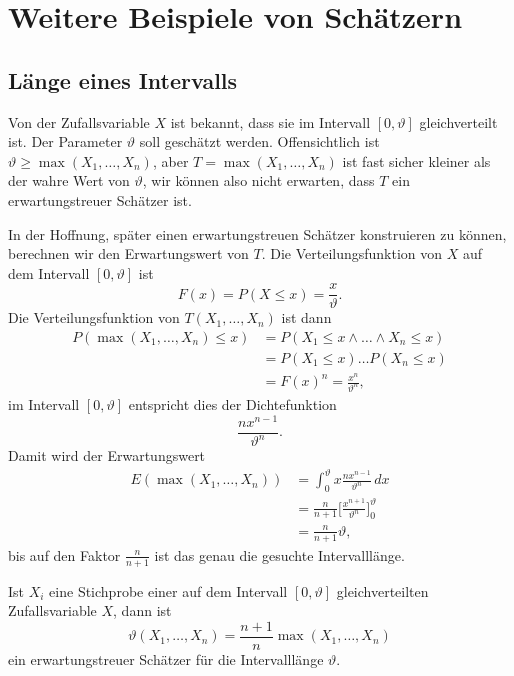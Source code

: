 \section{Weitere Beispiele von Schätzern} \label{section-weitere-beispiele-von-schaetzern}
\subsection{Länge eines Intervalls}
Von der Zufallsvariable $X$ ist bekannt, dass sie im Intervall $[0,\vartheta]$
gleichverteilt ist.
Der Parameter $\vartheta$ soll geschätzt werden.
Offensichtlich ist $\vartheta \ge \max(X_1,\dots,X_n)$,
aber $T=\max(X_1,\dots,X_n)$ ist fast sicher kleiner als der wahre
Wert von $\vartheta$, wir können also nicht erwarten, dass $T$ ein
erwartungstreuer Schätzer ist.

In der Hoffnung, später einen erwartungstreuen Schätzer konstruieren
zu können, berechnen wir den Erwartungswert von $T$.
Die Verteilungsfunktion von $X$ auf dem Intervall $[0,\vartheta]$ ist
\begin{equation}
F(x)=P(X\le x)= \frac{x}{\vartheta}.
\end{equation}
Die Verteilungsfunktion von $T(X_1,\dots,X_n)$ ist dann
\begin{align*}
P(\max(X_1,\dots,X_n)\le x)
&=
P(X_1\le x\wedge\dots\wedge X_n\le x)
\\
&=
P(X_1\le x)\dots P(X_n\le x)
\\
&=
F(x)^n=\frac{x^n}{\vartheta^n},
\end{align*}
im Intervall $[0,\vartheta]$ entspricht dies der Dichtefunktion
\begin{equation}
\frac{nx^{n-1}}{\vartheta^n}.
\end{equation}
Damit wird der Erwartungswert
\begin{align*}
E(\max(X_1,\dots,X_n))
&=
\int_0^{\vartheta}x\frac{nx^{n-1}}{\vartheta^n}\,dx
\\
&=
\frac{n}{n+1}\biggl[\frac{x^{n+1}}{\vartheta^n}\biggr]_0^\vartheta
\\
&=
\frac{n}{n+1}\vartheta,
\end{align*}
bis auf den Faktor $\frac{n}{n+1}$ ist das genau die gesuchte Intervalllänge.
\begin{satz}
Ist $X_i$ eine Stichprobe einer auf dem Intervall $[0,\vartheta]$
gleichverteilten Zufallsvariable $X$, dann ist
\begin{equation}
\vartheta(X_1,\dots,X_n)=\frac{n+1}{n}\max(X_1,\dots, X_n)
\end{equation}
ein erwartungstreuer Schätzer für die Intervalllänge $\vartheta$.
\end{satz}

